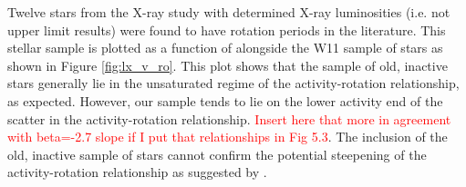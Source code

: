 

Twelve stars from the X-ray study \citep{Booth_etal_2017} with determined X-ray luminosities (i.e. not upper limit results) were found to have rotation periods in the literature. This stellar sample is plotted as a function of \Ro alongside the W11 sample of stars as shown in Figure \ref{fig:lx_v_ro}. This plot shows that the sample of old, inactive stars generally lie in the unsaturated regime of the activity-rotation relationship, as expected. However, our sample tends to lie on the lower activity end of the scatter in the activity-rotation relationship. \textcolor{red}{Insert here that more in agreement with beta=-2.7 slope if I put that relationships in Fig 5.3}. The inclusion of the old, inactive sample of stars cannot confirm the potential steepening of the activity-rotation relationship as suggested by \citet{Booth_etal_2017}.

